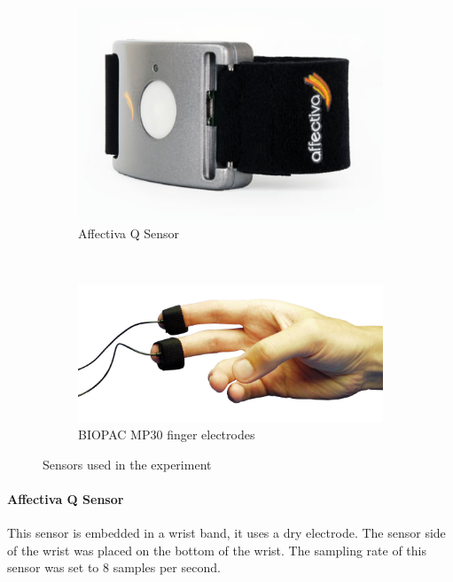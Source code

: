 \documentclass[11pt,leqno,a4paper]{report} %
\begin{document}
\begin{figure}[H]
\hspace*{-.1\textwidth}        \centering
        \begin{subfigure}[b]{0.6\textwidth}
                \includegraphics[width=\textwidth]{affectiva.jpg}
                \caption{Affectiva Q Sensor}
                \label{fig:aff}
        \end{subfigure}%
        ~ 
        \begin{subfigure}[b]{0.6\textwidth}
                \includegraphics[width=\textwidth]{bioelec.jpg}
                \caption{BIOPAC MP30 finger electrodes}
                \label{fig:bio}
        \end{subfigure}
        \caption{Sensors used in the experiment}\label{fig:animals}
\end{figure}


\paragraph{Affectiva Q Sensor}
This sensor is embedded in a wrist band, it uses a dry electrode. The sensor side of the wrist was placed on the bottom of the wrist. The sampling rate of this sensor was set to 8 samples per second.
\end{document}
